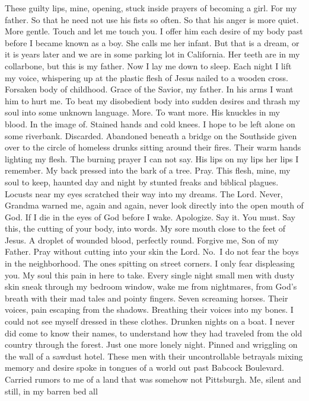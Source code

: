 \documentclass[
]{memoir}
\newlength{\drop}%
\begin{document}
These guilty lips, mine, opening, stuck inside prayers of becoming a
girl. For my father. So that he need not use his fists so often. So that
his anger is more quiet. More gentle. Touch and let me touch you. I
offer him each desire of my body past before I became known as a boy.
She calls me her infant. But that is a dream, or it is years later and
we are in some parking lot in California. Her teeth are in my
collarbone, but this is my father. Now I lay me down to sleep. Each
night I lift my voice, whispering up at the plastic flesh of Jesus
nailed to a wooden cross. Forsaken body of childhood. Grace of the
Savior, my father. In his arms I want him to hurt me. To beat my
disobedient body into sudden desires and thrash my soul into some
unknown language. More. To want more. His knuckles in my blood. In the
image of. Stained hands and cold knees. I hope to be left alone on some
riverbank. Discarded. Abandoned beneath a bridge on the Southside given
over to the circle of homeless drunks sitting around their fires. Their
warm hands lighting my flesh. The burning prayer I can not say. His lips
on my lips her lips I remember. My back pressed into the bark of a tree.
Pray. This flesh, mine, my soul to keep, haunted day and night by
stunted freaks and biblical plagues. Locusts near my eyes scratched
their way into my dreams. The Lord. Never, Grandma warned me, again and
again, never look directly into the open mouth of God. If I die in the
eyes of God before I wake. Apologize. Say it. You must. Say this, the
cutting of your body, into words. My sore mouth close to the feet of
Jesus. A droplet of wounded blood, perfectly round. Forgive me, Son of
my Father. Pray without cutting into your skin the Lord. No.~I do not
fear the boys in the neighborhood. The ones spitting on street corners.
I only fear displeasing you. My soul this pain in here to take. Every
single night small men with dusty skin sneak through my bedroom window,
wake me from nightmares, from God's breath with their mad tales and
pointy fingers. Seven screaming horses. Their voices, pain escaping from
the shadows. Breathing their voices into my bones. I could not see
myself dressed in these clothes. Drunken nights on a boat. I never did
come to know their names, to understand how they had traveled from the
old country through the forest. Just one more lonely night. Pinned and
wriggling on the wall of a sawdust hotel. These men with their
uncontrollable betrayals mixing memory and desire spoke in tongues of a
world out past Babcock Boulevard. Carried rumors to me of a land that
was somehow not Pittsburgh. Me, silent and still, in my barren bed all
\end{document}

